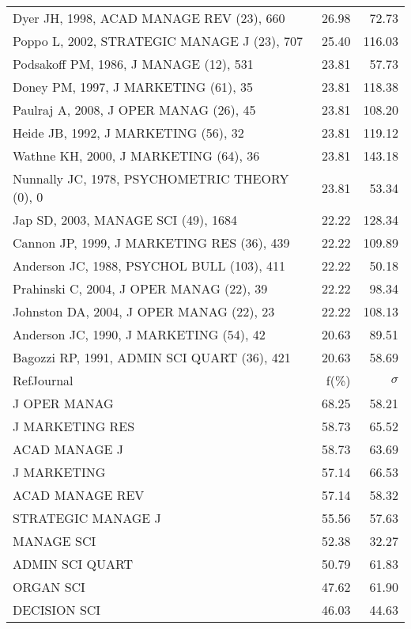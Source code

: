 \documentclass[a4paper,11pt]{report}
\begin{document}
\begin{landscape}
\begin{table}[!ht]
{\begin{tabular}{|l r r|}
Dyer JH, 1998, ACAD MANAGE REV (23), 660 & 26.98 & 72.73\\
Poppo L, 2002, STRATEGIC MANAGE J (23), 707 & 25.40 & 116.03\\
Podsakoff PM, 1986, J MANAGE (12), 531 & 23.81 & 57.73\\
Doney PM, 1997, J MARKETING (61), 35 & 23.81 & 118.38\\
Paulraj A, 2008, J OPER MANAG (26), 45 & 23.81 & 108.20\\
Heide JB, 1992, J MARKETING (56), 32 & 23.81 & 119.12\\
Wathne KH, 2000, J MARKETING (64), 36 & 23.81 & 143.18\\
Nunnally JC, 1978, PSYCHOMETRIC THEORY (0), 0 & 23.81 & 53.34\\
Jap SD, 2003, MANAGE SCI (49), 1684 & 22.22 & 128.34\\
Cannon JP, 1999, J MARKETING RES (36), 439 & 22.22 & 109.89\\
Anderson JC, 1988, PSYCHOL BULL (103), 411 & 22.22 & 50.18\\
Prahinski C, 2004, J OPER MANAG (22), 39 & 22.22 & 98.34\\
Johnston DA, 2004, J OPER MANAG (22), 23 & 22.22 & 108.13\\
Anderson JC, 1990, J MARKETING (54), 42 & 20.63 & 89.51\\
Bagozzi RP, 1991, ADMIN SCI QUART (36), 421 & 20.63 & 58.69\\
\hline
\hline
RefJournal & f(\%) & $\sigma$\\
\hline
J OPER MANAG & 68.25 & 58.21\\
J MARKETING RES & 58.73 & 65.52\\
ACAD MANAGE J & 58.73 & 63.69\\
J MARKETING & 57.14 & 66.53\\
ACAD MANAGE REV & 57.14 & 58.32\\
STRATEGIC MANAGE J & 55.56 & 57.63\\
MANAGE SCI & 52.38 & 32.27\\
ADMIN SCI QUART & 50.79 & 61.83\\
ORGAN SCI & 47.62 & 61.90\\
DECISION SCI & 46.03 & 44.63\\
\hline
\end{tabular}
}
\end{table}

\end{landscape}
\end{document}
